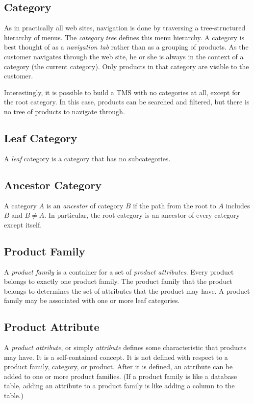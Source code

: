 \documentclass[letterpaper, 12pt]{article}
\begin{document}
\subsection{Category}
As in practically all web sites, navigation is done by traversing a tree-structured hierarchy of menus. The {\em category tree} defines this menu hierarchy. A category is best thought of as a \textit{navigation tab} rather than as a grouping of products.  As the customer navigates through the web site, he or she is always in the context of a category (the current category).  Only products in that category are visible to the customer. 

Interestingly, it is possible to build a TMS with no categories at all, except for the root category.  In this case, products can be searched and filtered, but there is no tree of products to navigate through. 

\subsection{Leaf Category}
A \emph{leaf} category is a category that has no subcategories. 

\subsection{Ancestor Category}
A category  $A$ is an \emph{ancestor} of category $B$ if the path from the root to $A$ includes $B$ and $B \neq A$. In particular, the root category is an ancestor of every category except itself.

\subsection{Product Family}
A {\em product family} is a container for a set of \textit{product attributes}. Every product belongs to exactly one product family.  The product family that the product belongs to determines the set of attributes that the product may have.  A product family may be associated with one or more leaf categories.

\subsection{Product Attribute}
A \textit{product attribute}, or simply \textit{attribute} defines some characteristic that products may have.   It is a self-contained concept.  It is not defined with respect to a product family, category, or product.  After it is defined, an attribute can be added to one or more product families.  (If a product family is like a database table, adding an attribute to a product family is like adding a column to the table.)
\end{document}
